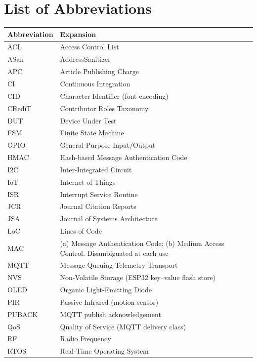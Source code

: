 \chapter*{List of Abbreviations}

\begin{longtable}{@{}p{}p{}@{}}
\toprule
\textbf{Abbreviation} & \textbf{Expansion} \\
\midrule
\endhead
ACL      & Access Control List \\
ASan     & AddressSanitizer \\
APC      & Article Publishing Charge \\
CI       & Continuous Integration \\
CID      & Character Identifier (font encoding) \\
CRediT   & Contributor Roles Taxonomy \\
DUT      & Device Under Test \\
FSM      & Finite State Machine \\
GPIO     & General-Purpose Input/Output \\
HMAC     & Hash-based Message Authentication Code \\
I2C      & Inter-Integrated Circuit \\
IoT      & Internet of Things \\
ISR      & Interrupt Service Routine \\
JCR      & Journal Citation Reports \\
JSA      & Journal of Systems Architecture \\
LoC      & Lines of Code \\
MAC      & (a) Message Authentication Code; (b) Medium Access Control. Disambiguated at each use \\
MQTT     & Message Queuing Telemetry Transport \\
NVS      & Non-Volatile Storage (ESP32 key--value flash store) \\
OLED     & Organic Light-Emitting Diode \\
PIR      & Passive Infrared (motion sensor) \\
PUBACK   & MQTT publish acknowledgement \\
QoS      & Quality of Service (MQTT delivery class) \\
RF       & Radio Frequency \\
RTOS     & Real-Time Operating System \\

\end{longtable}
